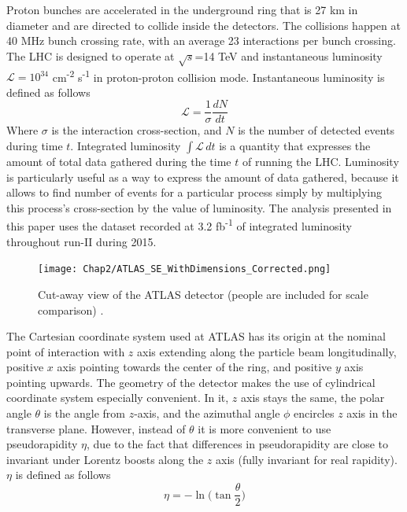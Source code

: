 Proton bunches are accelerated in the underground ring that is 27 km in diameter and are directed to collide inside the detectors. The collisions happen at 40 MHz bunch crossing rate, with an average 23 interactions per bunch crossing. The LHC is designed to operate at $\sqrt{s}$=14 TeV and instantaneous luminosity $\mathcal{L} = 10^{34}$ cm\textsuperscript{-2} s\textsuperscript{-1} in proton-proton collision mode. Instantaneous luminosity is defined as follows
\begin{equation}
\mathcal{L} = \frac{1}{\sigma}\frac{dN}{dt}
\end{equation}  
Where $\sigma$ is the interaction cross-section, and $N$ is the number of detected events during time $t$. Integrated luminosity $\int \mathcal{L}\, dt$ is a quantity that expresses the amount of total data gathered during the time $t$ of running the LHC. Luminosity  is particularly useful as a way to express the amount of data gathered, because it allows to find number of events for a particular process simply by multiplying this process's cross-section by the value of luminosity. The analysis presented in this paper uses the dataset recorded at 3.2 fb\textsuperscript{-1} of integrated luminosity throughout run-II during 2015. 


\begin{figure}[!t]
	\centering
    \captionsetup{width=\textwidth}
	\texttt{[image: Chap2/ATLAS\_SE\_WithDimensions\_Corrected.png]}
\caption[Cut-away view of the ATLAS detector]{\label{fig:detector}  Cut-away view of the ATLAS detector (people are included for scale comparison) \citep{aad2008atlas}. }
\end{figure}

The Cartesian coordinate system used at ATLAS has its origin at the nominal point of interaction with $z$ axis extending along the particle beam longitudinally, positive $x$ axis pointing towards the center of the ring, and positive $y$ axis pointing upwards. 
The geometry of the detector makes the use of cylindrical coordinate system especially convenient. In it, $z$ axis stays the same, the polar angle $\theta$ is the angle from $z$-axis, and the azimuthal angle $\phi$ encircles $z$ axis in the transverse plane. However, instead of $\theta$ it is more convenient to use pseudorapidity $\eta$, due to the fact that differences in pseudorapidity are close to invariant under Lorentz boosts along the $z$ axis (fully invariant for real rapidity). $\eta$ is defined as follows
\begin{equation}
\eta = -\ln\biggl(\tan\frac{\theta}{2}\biggr)
\end{equation}

